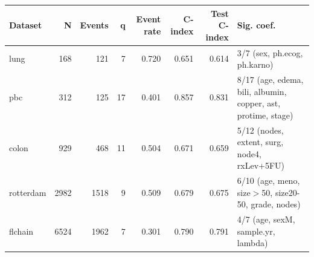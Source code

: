 \begin{tabular}{lrrrrrrl}
  \toprule
Dataset & N & Events & q & Event rate & C-index & Test C-index & Sig. coef. \\ 
  \midrule
lung & 168 & 121 & 7 & 0.720 & 0.651 & 0.614 & 3/7 (sex, ph.ecog, ph.karno) \\ 
  pbc & 312 & 125 & 17 & 0.401 & 0.857 & 0.831 & 8/17 (age, edema, bili, albumin, copper, ast, protime, stage) \\ 
  colon & 929 & 468 & 11 & 0.504 & 0.671 & 0.659 & 5/12 (nodes, extent, surg, node4, rxLev+5FU) \\ 
  rotterdam & 2982 & 1518 & 9 & 0.509 & 0.679 & 0.675 & 6/10 (age, meno, size$>$50, size20-50, grade, nodes) \\ 
  flchain & 6524 & 1962 & 7 & 0.301 & 0.790 & 0.791 & 4/7 (age, sexM, sample.yr, lambda) \\ 
   \bottomrule
\end{tabular}
